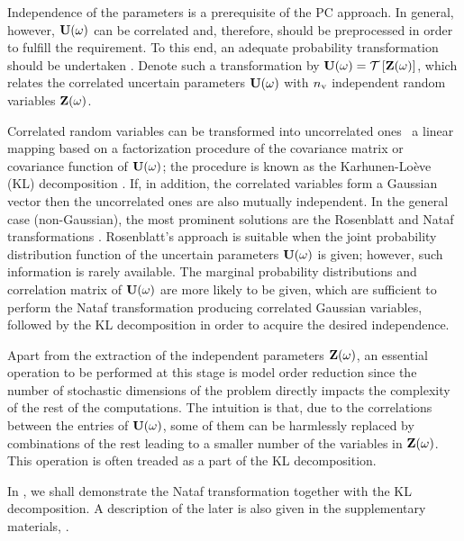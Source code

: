 Independence of the parameters is a prerequisite of the PC approach.
In general, however, $\mathbf{U}(\omega)$ can be correlated and, therefore, should be preprocessed in order to fulfill the requirement.
To this end, an adequate probability transformation should be undertaken \cite{eldred2008}.
Denote such a transformation by $\vU(\o) = \oTransform{\vZ(\o)}$, which relates the correlated uncertain parameters $\mathbf{U}(\omega)$ with ${n_\text{v}}$ independent random variables $\mathbf{Z}(\omega)$.

Correlated random variables can be transformed into uncorrelated ones \via\ a linear mapping based on a factorization procedure of the covariance matrix or covariance function of $\mathbf{U}(\omega)$; the procedure is known as the Karhunen-Lo\`{e}ve (KL) decomposition \cite{ghanem1991}.
If, in addition, the correlated variables form a Gaussian vector then the uncorrelated ones are also mutually independent.
In the general case (non-Gaussian), the most prominent solutions are the Rosenblatt \cite{rosenblatt1952} and Nataf transformations \cite{li2008}.
Rosenblatt's approach is suitable when the joint probability distribution function of the uncertain parameters $\mathbf{U}(\omega)$ is given; however, such information is rarely available.
The marginal probability distributions and correlation matrix of $\mathbf{U}(\omega)$ are more likely to be given, which are sufficient to perform the Nataf transformation producing correlated Gaussian variables, followed by the KL decomposition in order to acquire the desired independence.

Apart from the extraction of the independent parameters $\mathbf{Z}(\omega)$, an essential operation to be performed at this stage is model order reduction since the number of stochastic dimensions of the problem directly impacts the complexity of the rest of the computations.
The intuition is that, due to the correlations between the entries of $\mathbf{U}(\omega)$, some of them can be harmlessly replaced by combinations of the rest leading to a smaller number of the variables in $\mathbf{Z}(\omega)$.
This operation is often treaded as a part of the KL decomposition.

In , we shall demonstrate the Nataf transformation together with the KL decomposition.
A description of the later is also given in the supplementary materials, .
